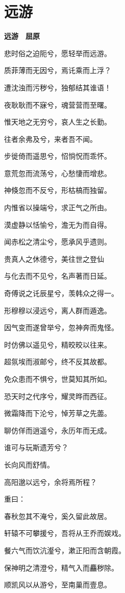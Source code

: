 \documentclass[12pt,a4paper]{ctexbook}
\begin{document}
\section{远游}
\textbf{远游　屈原}\par\vspace{0.5em}
悲时俗之迫阨兮，愿轻举而远游。\par
质菲薄而无因兮，焉讬乘而上浮？\par
遭沈浊而污秽兮，独郁结其谁语！\par
夜耿耿而不寐兮，魂营营而至曙。\par
惟天地之无穷兮，哀人生之长勤。\par
往者余弗及兮，来者吾不闻。\par
步徙倚而遥思兮，怊惝怳而乖怀。\par
意荒忽而流荡兮，心愁悽而增悲。\par
神倏忽而不反兮，形枯槁而独留。\par
内惟省以操端兮，求正气之所由。\par
漠虚静以恬愉兮，澹无为而自得。\par
闻赤松之清尘兮，愿承风乎遗则。\par
贵真人之休德兮，美往世之登仙\par
与化去而不见兮，名声著而日延。\par
奇傅说之讬辰星兮，羡韩众之得一。\par
形穆穆以浸远兮，离人群而遁逸。\par
因气变而遂曾举兮，忽神奔而鬼怪。\par
时仿佛以遥见兮，精晈晈以往来。\par
超氛埃而淑邮兮，终不反其故都。\par
免众患而不惧兮，世莫知其所如。\par
恐天时之代序兮，耀灵晔而西征。\par
微霜降而下沦兮，悼芳草之先蘦。\par
聊仿佯而逍遥兮，永历年而无成。\par
谁可与玩斯遗芳兮？\par
长向风而舒情。\par
高阳邈以远兮，余将焉所程？\par
重曰：\par
春秋忽其不淹兮，奚久留此故居。\par
轩辕不可攀援兮，吾将从王乔而娱戏。\par
餐六气而饮沆瀣兮，漱正阳而含朝霞。\par
保神明之清澄兮，精气入而麤秽除。\par
顺凯风以从游兮，至南巢而壹息。\par
\end{document}
